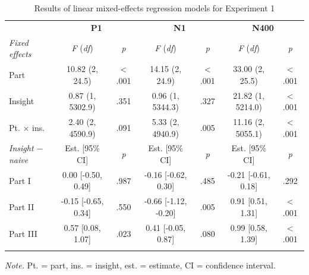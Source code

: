 \documentclass[
  english,
  man,11pt,floatsintext]{apa7}
\begin{document}
\begin{table}[tbp]

\begin{center}
\begin{threeparttable}

\caption{\label{tab:exp1-table}Results of linear mixed-effects regression models for Experiment 1}

\footnotesize{

\begin{tabular}{lcccccc}
\toprule
 & \multicolumn{2}{c}{\textbf{P1}} & \multicolumn{2}{c}{\textbf{N1}} & \multicolumn{2}{c}{\textbf{N400}} \\
\cmidrule(r){2-3} \cmidrule(r){4-5} \cmidrule(r){6-7}
\textit{Fixed effects} & \textit{F} (\textit{df}) & \textit{p} & \textit{F} (\textit{df}) & \textit{p} & \textit{F} (\textit{df}) & \textit{p}\\
\midrule
Part & 10.82 (2, 24.5) & < .001 & 14.15 (2, 24.9) & < .001 & 33.00 (2, 25.5) & < .001\\
Insight & 0.87 (1, 5302.9) & .351 & 0.96 (1, 5344.3) & .327 & 21.82 (1, 5214.0) & < .001\\
Pt. × ins. & 2.40 (2, 4590.9) & .091 & 5.33 (2, 4940.9) & .005 & 11.16 (2, 5055.1) & < .001\\
\textit{Insight $-$  naive} & Est. [95\% CI] & \textit{p} & Est. [95\% CI] & \textit{p} & Est. [95\% CI] & \textit{p}\\ \midrule
Part I & 0.00 [-0.50, 0.49] & .987 & -0.16 [-0.62, 0.30] & .485 & -0.21 [-0.61, 0.18] & .292\\
Part II & -0.15 [-0.65, 0.34] & .550 & -0.66 [-1.12, -0.20] & .005 & 0.91 [0.51, 1.31] & < .001\\
Part III & 0.57 [0.08, 1.07] & .023 & 0.41 [-0.05, 0.87] & .080 & 0.99 [0.58, 1.39] & < .001\\
\bottomrule
\addlinespace
\end{tabular}

}

\begin{tablenotes}[para]
\normalsize{\textit{Note.} Pt. = part, ins. = insight, est. = estimate, CI = confidence interval.}
\end{tablenotes}

\end{threeparttable}
\end{center}

\end{table}
\end{document}
